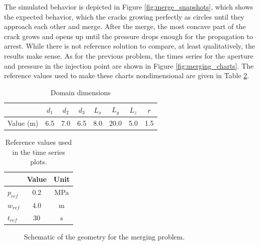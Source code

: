 The simulated behavior is depicted in Figure \ref{fig:merge_snapshots}, which shows the expected behavior, which the cracks growing perfectly as circles until they approach each other and merge. After the merge, the most concave part of the crack grows and opens up until the pressure drops enough for the propagation to arrest. While there is not reference solution to compare, at least qualitatively, the results make sense. As for the previous problem, the times series for the aperture and pressure in the injection point are shown in Figure \ref{fig:merging_charts}. The reference values used to make these charts nondimensional are given in Table \ref{merging_refs}.

\begin{table}[ht]
  \centering
  \caption{Domain dimensions}
  \begin{tabular}[t]{lccccccc}
  \hline
  &$d_1$&$d_2$&$d_3$&$L_x$&$L_y$&$L_z$&$r$\\  
  \hline
  Value (m) & 6.5 & 7.0 & 6.5 & 8.0 & 20.0 & 5.0 & 1.5\\
  \hline
  \end{tabular}
  \label{merging_measures}
\end{table}%

\begin{table}[ht]
  \centering
  \caption{Reference values used in the time series plots.}
  \begin{tabular}[t]{lcc}
  \hline
  &Value &Unit \\
  \hline
  $p_{ref}$&0.2&MPa\\
  $w_{ref}$&4.0&m\\
  $t_{ref}$&30&$\text{s}$\\
  \hline
  \end{tabular}
  \label{merging_refs}
\end{table}%

\begin{figure}[ht]
  \centering
  \caption{Schematic of the geometry for the merging problem.}
  \label{fig:merging_schematic}
\end{figure}


